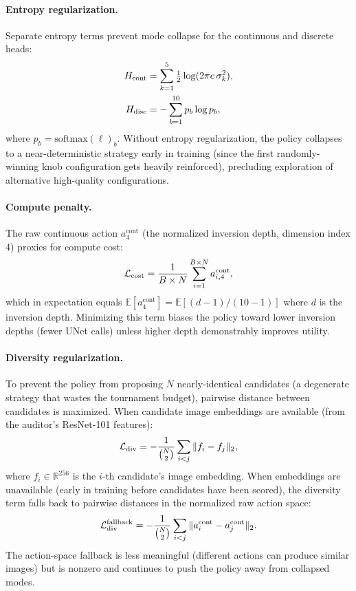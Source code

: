 \paragraph{Entropy regularization.}
Separate entropy terms prevent mode collapse for the continuous and
discrete heads:
\begin{equation}
\begin{aligned}
H_\text{cont}
&=
\sum_{k=1}^{5}
\tfrac{1}{2}\log(2\pi e\,\sigma_k^2),
\\
H_\text{disc}
&=
-\sum_{b=1}^{10} p_b \log p_b, \notag
\end{aligned}
\label{eq:entropy_terms}
\end{equation}
where $p_b = \mathrm{softmax}(\ell)_b$.
Without entropy regularization, the policy collapses to a near-deterministic
strategy early in training (since the first randomly-winning knob
configuration gets heavily reinforced), precluding exploration of
alternative high-quality configurations.

\paragraph{Compute penalty.}
The raw continuous action $a_4^\text{cont}$ (the normalized inversion depth,
dimension index 4) proxies for compute cost:
\begin{equation}
  \mathcal{L}_\text{cost} = \frac{1}{B \times N}
    \sum_{i=1}^{B \times N} a_{i,4}^\text{cont}, \notag
  \label{eq:tspo_cost}
\end{equation}
which in expectation equals $\mathbb{E}[a_4^\text{cont}]
= \mathbb{E}[(d - 1)/(10 - 1)]$ where $d$ is the inversion depth.
Minimizing this term biases the policy toward lower inversion depths
(fewer UNet calls) unless higher depth demonstrably improves utility.

\paragraph{Diversity regularization.}
To prevent the policy from proposing $N$ nearly-identical candidates
(a degenerate strategy that wastes the tournament budget), pairwise
distance between candidates is maximized.
When candidate image embeddings are available (from the auditor's ResNet-101
features):
\begin{equation}
  \mathcal{L}_\text{div} = -\frac{1}{\binom{N}{2}}
    \sum_{i < j} \|f_i - f_j\|_2, \notag
  \label{eq:tspo_div_embed}
\end{equation}
where $f_i \in \mathbb{R}^{256}$ is the $i$-th candidate's image embedding.
When embeddings are unavailable (early in training before candidates have
been scored), the diversity term falls back to pairwise distances in the
normalized raw action space:
\begin{equation}
  \mathcal{L}_\text{div}^\text{fallback} = -\frac{1}{\binom{N}{2}}
    \sum_{i < j} \|a_i^\text{cont} - a_j^\text{cont}\|_2. \notag
  \label{eq:tspo_div_action}
\end{equation}
The action-space fallback is less meaningful (different actions can produce
similar images) but is nonzero and continues to push the policy away from
collapsed modes.

